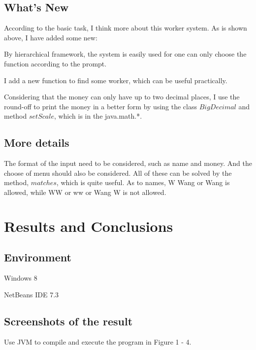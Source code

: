 \documentclass{article}
\begin{document}
\subsection{What's New}
According to the basic task, I think more about this worker system. As is shown above, I have added some new:
\begin{compactitem}
\item By hierarchical framework, the system is easily used for one can only choose the function according to the prompt.

\item I add a new function to find some worker, which can be useful practically.

\item Considering that the money can only have up to two decimal places, I use the round-off to print the money in a better form by using the class $BigDecimal$ and method $setScale$, which is in the java.math.*.

\end{compactitem}

\subsection{More details}
The format of the input need to be considered, such as name and money. And the choose of menu should also be considered. All of these can be solved by the method, $matches$, which is quite useful. As to names, W Wang or Wang is allowed, while WW or ww or Wang W is not allowed.


\section{Results and Conclusions}
\subsection{Environment}
\begin{compactitem}
\item Windows 8
\item NetBeans IDE 7.3
\end{compactitem}
\subsection{Screenshots of the result}
Use JVM to compile and execute the program in Figure 1 - 4.
\end{document}
